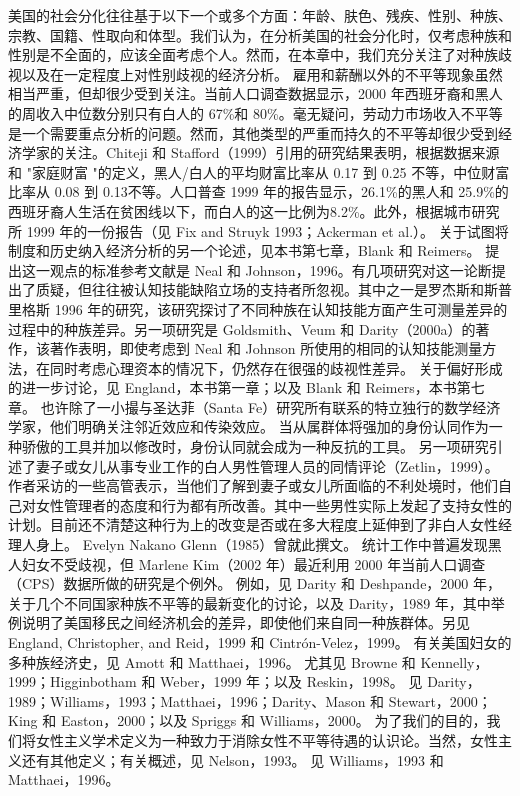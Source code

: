 \documentclass[UTF8]{ctexart}
\begin{document}
\begin{thebibliography}{16}
    美国的社会分化往往基于以下一个或多个方面：年龄、肤色、残疾、性别、种族、宗教、国籍、性取向和体型。我们认为，在分析美国的社会分化时，仅考虑种族和性别是不全面的，应该全面考虑个人。然而，在本章中，我们充分关注了对种族歧视以及在一定程度上对性别歧视的经济分析。
    雇用和薪酬以外的不平等现象虽然相当严重，但却很少受到关注。当前人口调查数据显示，2000 年西班牙裔和黑人的周收入中位数分别只有白人的 67\%和 80\%。毫无疑问，劳动力市场收入不平等是一个需要重点分析的问题。然而，其他类型的严重而持久的不平等却很少受到经济学家的关注。Chiteji 和 Stafford（1999）引用的研究结果表明，根据数据来源和 "家庭财富 "的定义，黑人/白人的平均财富比率从 0.17 到 0.25 不等，中位财富比率从 0.08 到 0.13不等。人口普查 1999 年的报告显示，26.1\%的黑人和 25.9\%的西班牙裔人生活在贫困线以下，而白人的这一比例为8.2\%。此外，根据城市研究所 1999 年的一份报告（见 Fix and Struyk 1993；Ackerman et al.）。
    关于试图将制度和历史纳入经济分析的另一个论述，见本书第七章，Blank 和 Reimers。
    提出这一观点的标准参考文献是 Neal 和 Johnson，1996。有几项研究对这一论断提出了质疑，但往往被认知技能缺陷立场的支持者所忽视。其中之一是罗杰斯和斯普里格斯 1996 年的研究，该研究探讨了不同种族在认知技能方面产生可测量差异的过程中的种族差异。另一项研究是 Goldsmith、Veum 和 Darity（2000a）的著作，该著作表明，即使考虑到 Neal 和 Johnson 所使用的相同的认知技能测量方法，在同时考虑心理资本的情况下，仍然存在很强的歧视性差异。
    关于偏好形成的进一步讨论，见 England，本书第一章；以及 Blank 和 Reimers，本书第七章。
    也许除了一小撮与圣达菲（Santa Fe）研究所有联系的特立独行的数学经济学家，他们明确关注邻近效应和传染效应。
    当从属群体将强加的身份认同作为一种骄傲的工具并加以修改时，身份认同就会成为一种反抗的工具。
    另一项研究引述了妻子或女儿从事专业工作的白人男性管理人员的同情评论（Zetlin，1999）。作者采访的一些高管表示，当他们了解到妻子或女儿所面临的不利处境时，他们自己对女性管理者的态度和行为都有所改善。其中一些男性实际上发起了支持女性的计划。目前还不清楚这种行为上的改变是否或在多大程度上延伸到了非白人女性经理人身上。
    Evelyn Nakano Glenn（1985）曾就此撰文。
    统计工作中普遍发现黑人妇女不受歧视，但 Marlene Kim（2002 年）最近利用 2000 年当前人口调查（CPS）数据所做的研究是个例外。
    例如，见 Darity 和 Deshpande，2000 年，关于几个不同国家种族不平等的最新变化的讨论，以及 Darity，1989 年，其中举例说明了美国移民之间经济机会的差异，即使他们来自同一种族群体。另见 England, Christopher, and Reid，1999 和 Cintrón-Velez，1999。
    有关美国妇女的多种族经济史，见 Amott 和 Matthaei，1996。
    尤其见 Browne 和 Kennelly，1999；Higginbotham 和 Weber，1999 年；以及 Reskin，1998。
    见 Darity，1989；Williams，1993；Matthaei，1996；Darity、Mason 和 Stewart，2000；King 和 Easton，2000；以及 Spriggs 和 Williams，2000。
    为了我们的目的，我们将女性主义学术定义为一种致力于消除女性不平等待遇的认识论。当然，女性主义还有其他定义；有关概述，见 Nelson，1993。
    见 Williams，1993 和 Matthaei，1996。
    
\end{thebibliography}
\end{document}
